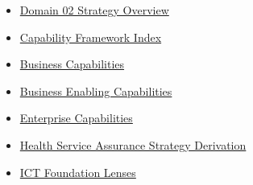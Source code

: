 \begin{itemize}

\item
\href{https://github.com/fhirfactory/harmonia/blob/98410db60155198a75f74c79d98060070209faa1/docs/markdown/02-strategy/README.md}{Domain 02 Strategy Overview}



\item
\href{https://github.com/fhirfactory/harmonia/blob/98410db60155198a75f74c79d98060070209faa1/docs/markdown/02-strategy/capabilities/index.md}{Capability Framework Index}



\item
\hyperref[rad:business]{Business Capabilities}



\item
\hyperref[rad:enabling]{Business Enabling Capabilities}



\item
\hyperref[rad:enterprise]{Enterprise Capabilities}



\item
\hyperref[rad:assurance-strategy]{Health Service Assurance Strategy Derivation}



\item
\href{https://github.com/fhirfactory/harmonia/blob/98410db60155198a75f74c79d98060070209faa1/docs/markdown/02-strategy/capabilities/ict-foundation-lenses.md}{ICT Foundation Lenses}



\end{itemize}
